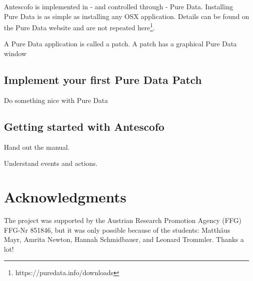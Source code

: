 \documentclass[onecolumn,nocopyrightspace,preprint]{sigplanconf}
\begin{document}
Antescofo is implemented in - and controlled through - Pure Data.
Installing Pure Data is as simple as installing any OSX application. Details can be found
on the Pure Data website and are not repeated here\footnote{https://puredata.info/downloads}.

A Pure Data application is called a patch. A patch has a graphical Pure Data window





\subsection{Implement your first Pure Data Patch}

Do something nice with Pure Data


\subsection{Getting started with Antescofo}


Hand out the manual.

Understand events and actions.







\section{Acknowledgments}

The project was supported by the Austrian Research Promotion Agency (FFG) FFG-Nr 851846, but it
was only possible because of the students: Matthäus Mayr, Amrita Newton, Hannah Schmidbauer, and
Leonard Trommler. Thanks a lot!


 
\end{document}
